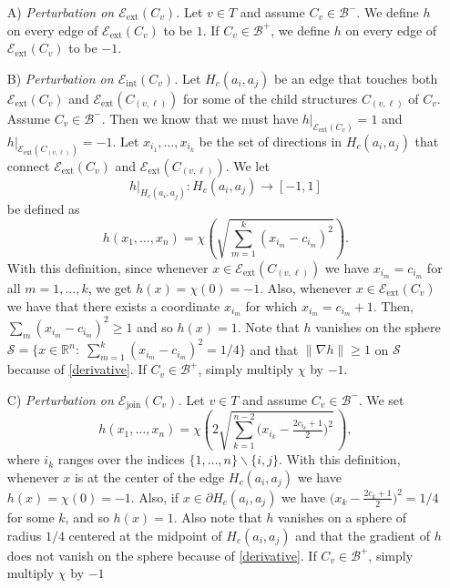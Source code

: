 \documentclass[11pt,reqno]{amsart}
\newcommand{\R}{{\mathbb R}}
\theoremstyle{definition}
\begin{document}
\begin{itemize}
\item[A)] \emph{Perturbation on $\mathcal E_{\text{ext}} (C_v)$.} Let $v \in T$ and assume $C_v \in \mathcal B^-$. We define $h$  on every edge of  $\mathcal E_{\text{ext}} (C_v)$  to be $1$.   If  $C_v  \in \mathcal B^+$, we define $h$  on every edge of  $\mathcal E_{\text{ext}} (C_v)$  to be $-1$.     \\

\item[B)] \emph{Perturbation on $\mathcal E_{\text{int}} (C_v)$.} Let $H_c(a_i, a_j)$ be an edge that touches both $\mathcal E_{\text{ext}} (C_v)$ and $\mathcal E_{\text{ext}} (C_{(v,\ell)})$ for some of the child structures $C_{(v,\ell)}$ of $C_v$. Assume $C_v  \in \mathcal B^-$.  Then we know that we must have $h|_{\mathcal E_{\text{ext}} (C_v)}=1$ and $h|_{{\mathcal E_{\text{ext}} (C_{(v,\ell)})}}=-1$. Let $x_{i_1}, \dots, x_{i_k}$ be the set of directions in  $H_c(a_i, a_j)$ that connect $\mathcal E_{\text{ext}} (C_v)$ and $\mathcal E_{\text{ext}} (C_{(v,\ell)})$. 
 We let
\[h|_{H_c(a_i,a_j)}:H_c(a_i,a_j) \to [-1,1]\] be defined as
\[h(x_1, \dots, x_n)=\chi \left(\sqrt{ \sum_{m=1}^k (x_{i_m}-c_{i_m})^2}\right).\]
With this definition, since whenever $x \in \mathcal E_{\text{ext}} (C_{(v,\ell)})$ we have $x_{i_m}=c_{i_m}$ for all $m=1, \dots, k$, we get $h(x)=\chi(0)=-1$. Also, whenever $x \in \mathcal E_{\text{ext}} (C_{v})$ we have that there exists a coordinate $x_{i_m}$ for which $x_{i_m}=c_{i_m}+1$. Then, $\sum_m(x_{i_m}-c_{i_m})^2 \geq 1$ and so $h(x)=1$. Note that $h$ vanishes on the sphere $\mathcal S=\{x \in \R^n:\; \sum_{m=1}^k (x_{i_m}-c_{i_m})^2=1/4\}$ and that $\|\nabla h\| \geq 1$ on $\mathcal S$ because of \eqref{derivative}. If  $C_v  \in \mathcal B^+$, simply multiply $\chi$ by $-1$. \\

\item[C)] \emph{Perturbation on $\mathcal E_{\text{join}} (C_v)$.}  Let $v \in T$ and assume $C_v \in \mathcal B^-$. We set
\[h(x_1, \dots, x_n)=\chi \left( 2 \sqrt{\sum_{k=1}^{n-2} \big(x_{i_k} - \tfrac{2c_{i_k} +1}{2}\big)^2}\,\right),\]
where $i_k$ ranges over  the indices $\{1, \dots, n\}\backslash \{i,j\}$.
With this definition, whenever $x$ is at the center of the edge $H_c(a_i,a_j)$ we have $h(x)= \chi(0)=-1$. Also, if $x \in \partial H_c(a_i,a_j)$ we have $ \big(x_k - \tfrac{2c_k +1}{2}\big)^2 =1/4$ for some $k$, and so $h(x)=1$. Also note that $h$ vanishes on a sphere of radius $1/4$ centered at the midpoint of $H_c(a_i,a_j)$ and that the gradient of $h$ does not vanish on the sphere because of \eqref{derivative}.  If  $C_v  \in \mathcal B^+$, simply multiply $\chi$ by $-1$
\end{itemize}\ \\
\end{document}
